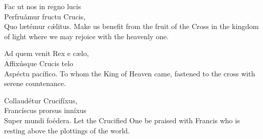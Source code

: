 Fac ut nos in regno lucis\\
Perfruámur fructu Crucis,\\
Quo lætémur cǽlitus.
\divverse
Make us benefit from the fruit of
the Cross in the kingdom of light
where we may rejoice with the
heavenly one.
\finishverse

Ad quem venit Rex e cælo,\\
Affixúsque Crucis telo\\
Aspéctu pacífico.
\divverse
To whom the King of Heaven
came, fastened to the cross with
serene countenance.
\finishverse

Collaudétur Crucifíxus,\\
Francíscus prorsus inníxus\\
Super mundi foédera.
\divverse
Let the Crucified One be praised
with Francis who is resting above
the plottings of the world.
\finishverse

